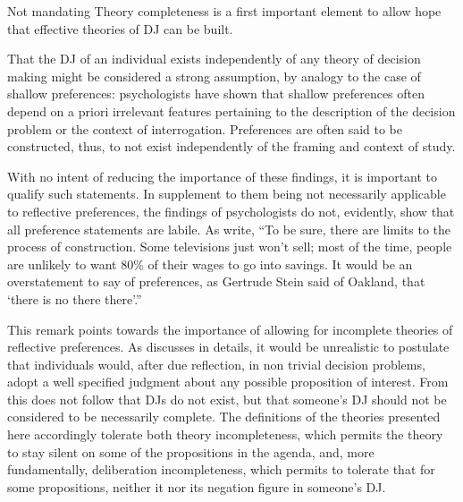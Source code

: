 \documentclass[version=last, pagesize, twoside=off, bibliography=totoc, DIV=calc, fontsize=12pt, a4paper, french, english]{scrartcl}
\begin{document}
Not mandating Theory completeness is a first important element to allow hope that effective theories of \ac{DJ} can be built.

That the \ac{DJ} of an individual exists independently of any theory of decision making might be considered a strong assumption, by analogy to the case of shallow preferences: psychologists have shown that shallow preferences often depend on a priori irrelevant features pertaining to the description of the decision problem or the context of interrogation. Preferences are often said to be constructed, thus, to not exist independently of the framing and context of study.

With no intent of reducing the importance of these findings, it is important to qualify such statements. In supplement to them being not necessarily applicable to reflective preferences, the findings of psychologists do not, evidently, show that all preference statements are labile. As \citet[p.\ xvi]{lichtenstein_construction_2006} write, “To be sure, there are limits to the process of construction. Some televisions just won’t sell; most of the time, people are unlikely to want 80\% of their wages to go into savings. It would be an overstatement to say of preferences, as Gertrude Stein said of Oakland, that ‘there is no there there’.”

This remark points towards the importance of allowing for incomplete theories of reflective preferences.  
As \citet{mandler_difficult_2001} discusses in details, it would be unrealistic to postulate that individuals would, after due reflection, in non trivial decision problems, adopt a well specified judgment about any possible proposition of interest.
From this does not follow that \acp{DJ} do not exist, but that someone’s \ac{DJ} should not be considered to be necessarily complete. 
The definitions of the theories presented here accordingly tolerate both theory incompleteness, which permits the theory to stay silent on some of the propositions in the agenda, and, more fundamentally, deliberation incompleteness, which permits to tolerate that for some propositions, neither it nor its negation figure in someone’s \ac{DJ}. 

\end{document}
